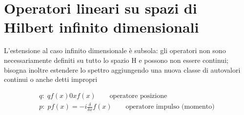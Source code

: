\documentclass[a4paper,11pt]{report}
\theoremstyle{remark}
\theoremstyle{definition}
\begin{document}
\chapter{Operatori lineari su spazi di Hilbert infinito dimensionali}

L'estensione al caso infinito dimensionale è subsola: gli operatori non sono necessariamente definiti su tutto lo spazio H e possono non essere continui; bisogna inoltre estendere lo spettro aggiungendo una nuova classe di autovalori continui o anche detti impropri

\begin{gather*}
	q: \; qf(x) 0 xf(x) \qquad \text{operatore posizione} \\
	p: \; pf(x) = -i\frac{\delta}{\delta x }f(x) \qquad \text{operatore impulso (momento)}
\end{gather*}
\end{document}
